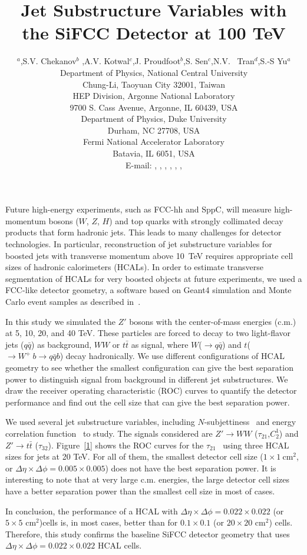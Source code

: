\documentclass[a4paper]{PoS}
\title{Jet Substructure Variables with the SiFCC Detector at 100 TeV}
\author{\speaker{C.-H Yeh}$^a$,S.V. Chekanov$^b$ ,A.V. Kotwal$^{c}$,J. Proudfoot$^{b}$,S. Sen$^{c}$,N.V. ~Tran$^{d}$,S.-S Yu$^{a}$\\     
     \llap{$^a$}Department of Physics, National Central University\\
     Chung-Li, Taoyuan City 32001, Taiwan\\
     \llap{$^b$}HEP Division, Argonne National Laboratory\\
     9700 S. Cass Avenue, Argonne, IL 60439, USA\\
     \llap{$^c$}Department of Physics, Duke University\\
     Durham, NC 27708, USA\\
     \llap{$^d$}Fermi National Accelerator Laboratory\\
     Batavia, IL 6051, USA\\
     E-mail:  \email{a9510130375@gmail.com},
     \email{chekanov@anl.gov},
     \email{kotwal@phy.duke.edu},
     \email{proudfoot@anl.gov},
     \email{sourav.sen@duke.edu},
     \email{ntran@fnal.gov},
     \email{syu@phy.ncu.edu.tw}}
\begin{document}
Future high-energy experiments, such as FCC-hh and SppC, 
will measure high-momentum bosons ($W$, $Z$, $H$) and top quarks 
with strongly collimated decay products that form hadronic jets. This leads to many
challenges for detector technologies.  In particular, reconstruction of jet substructure  variables for boosted jets with transverse
momentum above 10~TeV
requires appropriate  cell sizes of hadronic
calorimeters  (HCALs). In order to estimate 
transverse segmentation  
of HCALs for very boosted objects at future experiments, 
we used a FCC-like detector geometry,
a software based on Geant4 simulation and Monte Carlo event samples as described in~\cite{Chekanov:2016ppq}.
 
In this study we simulated the $Z'$ bosons with the center-of-mass energies (c.m.) at 5, 10, 20, and 40 TeV. These particles are forced to decay to two light-flavor jets ($q\bar{q}$) as background, $W W$ or $t\bar{t}$ as signal, where $W$($\rightarrow q\bar{q}$) and $t$($ \rightarrow  W^+\>b \rightarrow q\bar{q} b$) decay hadronically. We use different configurations of HCAL geometry to see whether the smallest configuration can give the best separation power to distinguish signal from background in different jet substructures. We draw the receiver operating characteristic (ROC) curves to quantify the detector performance and find out the cell size that can give the best separation power.

We used several jet substructure variables, including $N$-subjettiness~\cite{Thaler:2010tr} and energy correlation function~\cite{Larkoski:2013eya} to study. The signals considered are $Z'\rightarrow WW$ ($\tau_{21}$,$C_2^1$) and $Z' \rightarrow t\bar{t}$ ($\tau_{32}$). Figure~\ref{1} shows the ROC curves for the $\tau_{21}$~\cite{Thaler:2010tr} using three HCAL sizes for jets at 20 TeV. For all of them, the smallest detector cell size ($1\times1~\mathrm{cm}^2$, or $\Delta \eta \times \Delta \phi = 0.005\times0.005$) does not have the best separation power. It is interesting to note that at very large c.m. energies, the large detector cell sizes have a better separation power than the smallest cell size in most of cases. 

In conclusion, the  performance 
of a  HCAL with 
$\Delta \eta \times \Delta \phi = 0.022\times0.022$ (or $5\times5$ cm$^2$)cells is, in most cases,
better than for $0.1\times0.1$ (or $20\times20$ cm$^2$) cells.
Therefore, this study confirms the  baseline SiFCC detector geometry \cite{Chekanov:2016ppq}
that uses $\Delta \eta \times \Delta \phi = 0.022\times0.022$ HCAL cells.
\end{document}
